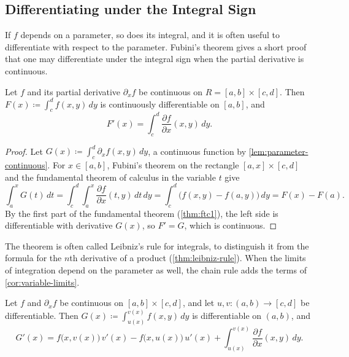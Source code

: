 \subsection{Differentiating under the Integral Sign}

If $f$ depends on a parameter, so does its integral, and it is often useful to differentiate with respect to the parameter. Fubini's theorem gives a short proof that one may differentiate under the integral sign when the partial derivative is continuous.

\begin{theorem}
\label{thm:diff-under-integral}
Let $f$ and its partial derivative $\partial_xf$ be continuous on $R=[a,b]\times[c,d]$. Then $F(x)\coloneqq\int_c^df(x,y)\,dy$ is continuously differentiable on $[a,b]$, and
\[
F'(x)=\int_c^d\frac{\partial f}{\partial x}(x,y)\,dy .
\]
\end{theorem}

\begin{proof}
Let $G(x)\coloneqq\int_c^d\partial_xf(x,y)\,dy$, a continuous function by \cref{lem:parameter-continuous}. For $x\in[a,b]$, Fubini's theorem on the rectangle $[a,x]\times[c,d]$ and the fundamental theorem of calculus in the variable $t$ give
\[
\int_a^xG(t)\,dt=\int_c^d\int_a^x\frac{\partial f}{\partial x}(t,y)\,dt\,dy=\int_c^d\bigl(f(x,y)-f(a,y)\bigr)\,dy=F(x)-F(a).
\]
By the first part of the fundamental theorem (\cref{thm:ftc1}), the left side is differentiable with derivative $G(x)$, so $F'=G$, which is continuous.
\end{proof}

The theorem is often called Leibniz's rule for integrals, to distinguish it from the formula for the $n$th derivative of a product (\cref{thm:leibniz-rule}). When the limits of integration depend on the parameter as well, the chain rule adds the terms of \cref{cor:variable-limits}.

\begin{corollary}
\label{cor:leibniz-variable}
Let $f$ and $\partial_xf$ be continuous on $[a,b]\times[c,d]$, and let $u,v\colon(a,b)\to[c,d]$ be differentiable. Then $G(x)\coloneqq\int_{u(x)}^{v(x)}f(x,y)\,dy$ is differentiable on $(a,b)$, and
\[
G'(x)=f\bigl(x,v(x)\bigr)\,v'(x)-f\bigl(x,u(x)\bigr)\,u'(x)+\int_{u(x)}^{v(x)}\frac{\partial f}{\partial x}(x,y)\,dy .
\]
\end{corollary}

